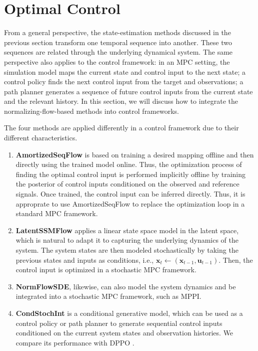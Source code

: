 \section{Optimal Control}
\label{sec:methods:control}

From a general perspective, the state-estimation methods discussed in the previous section transform one temporal sequence into another. These two sequences are related through the underlying dynamical system. The same perspective also applies to the control framework: in an \ac{MPC} setting, the simulation model maps the current state and control input to the next state; a control policy finds the next control input from the target and observations; a path planner generates a sequence of future control inputs from the current state and the relevant history. In this section, we will discuss how to integrate the normalizing-flow-based methods into control frameworks.

The four methods are applied differently in a control framework due to their different characteristics. 
\begin{enumerate}
    \item \textbf{AmortizedSeqFlow} is based on training a desired mapping offline and then directly using the trained model online. Thus, the optimization process of finding the optimal control input is performed implicitly offline by training the posterior of control inputs conditioned on the observed and reference signals. Once trained, the control input can be inferred directly. Thus, it is approprate to use AmortizedSeqFlow to replace the optimization loop in a standard \ac{MPC} framework.
    \item \textbf{LatentSSMFlow} applies a linear state space model in the latent space, which is natural to adapt it to capturing the underlying dynamics of the system. The system states are then modeled stochastically by taking the previous states and inputs as conditions, i.e., $\boldsymbol{x}_t \leftarrow (\boldsymbol{x}_{t-1}, \boldsymbol{u}_{t-1})$. Then, the control input is optimized in a stochastic \ac{MPC} framework.
    \item \textbf{NormFlowSDE}, likewise, can also model the system dynamics and be integrated into a stochastic \ac{MPC} framework, such as \ac{MPPI}.
    \item \textbf{CondStochInt} is a conditional generative model, which can be used as a control policy or path planner to generate sequential control inputs conditioned on the current system states and observation histories. We compare its performance with \ac{DPPO} \citep{ren2024diffusionpolicypolicyoptimization, black2024trainingdiffusionmodelsreinforcement}.
\end{enumerate}

